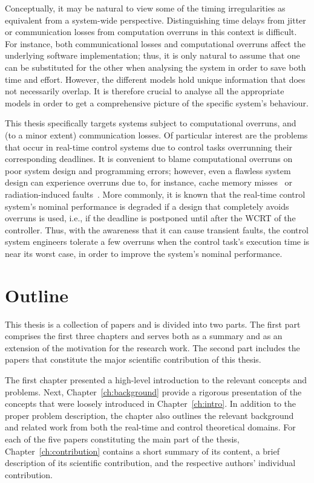 %
Conceptually, it may be natural to view some of the timing irregularities as equivalent from a system-wide perspective.
Distinguishing time delays from jitter or communication losses from computation overruns in this context is difficult.
For instance, both communicational losses and computational overruns affect the underlying software implementation; thus, it is only natural to assume that one can be substituted for the other when analysing the system in order to save both time and effort.
However, the different models hold unique information that does not necessarily overlap.
It is therefore crucial to analyse all the appropriate models in order to get a comprehensive picture of the specific system's behaviour.

This thesis specifically targets systems subject to computational overruns, and (to a minor extent) communication losses.
Of particular interest are the problems that occur in real-time control systems due to control tasks overrunning their corresponding deadlines.
It is convenient to blame computational overruns on poor system design and programming errors; however, even a flawless system design can experience overruns due to, for instance, cache memory misses~\cite{Gracioli:2015} or radiation-induced faults~\cite{Tsog:2021}.
More commonly, it is known that the real-time control system's nominal performance is degraded if a design that completely avoids overruns is used, i.e., if the deadline is postponed until after the WCRT of the controller.
Thus, with the awareness that it can cause transient faults, the control system engineers tolerate a few overruns when the control task's execution time is near its worst case, in order to improve the system's nominal performance.



\section{Outline}%
\label{sec:intro:outline}%
%
This thesis is a collection of papers and is divided into two parts.
The first part comprises the first three chapters and serves both as a summary and as an extension of the motivation for the research work.
The second part includes the papers that constitute the major scientific contribution of this thesis.

The first chapter presented a high-level introduction to the relevant concepts and problems.
Next, Chapter~\ref{ch:background} provide a rigorous presentation of the concepts that were loosely introduced in Chapter~\ref{ch:intro}.
In addition to the proper problem description, the chapter also outlines the relevant background and related work from both the real-time and control theoretical domains.
For each of the five papers constituting the main part of the thesis, Chapter~\ref{ch:contribution} contains a short summary of its content, a brief description of its scientific contribution, and the respective authors' individual contribution.
